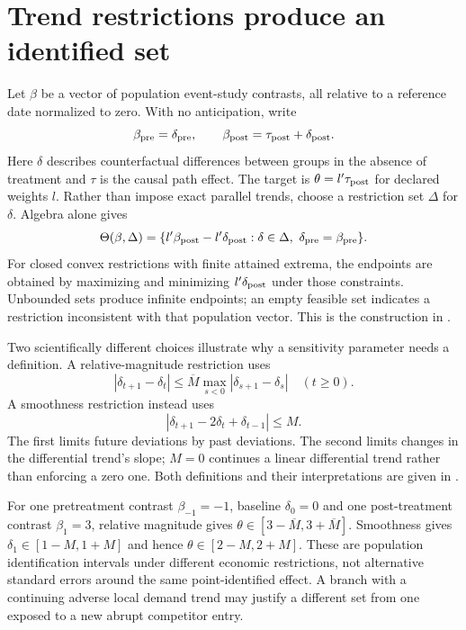\section{Trend restrictions produce an identified set}
\label{r3:trend-sensitivity}
Let $\beta$ be a vector of population event-study contrasts, all
relative to a reference date normalized to zero. With no anticipation,
write
\[
 \beta_{\rm pre}=\delta_{\rm pre},\qquad
 \beta_{\rm post}=\tau_{\rm post}+\delta_{\rm post}.
\]
Here $\delta$ describes counterfactual differences between groups in
the absence of treatment and $\tau$ is the causal path effect. The
target is $\theta=l'\tau_{\rm post}$ for declared weights $l$.
Rather than impose exact parallel trends, choose a restriction set
$\Delta$ for $\delta$. Algebra alone gives
\begin{equation}
 \Theta(\beta,\Delta)=
 \{l'\beta_{\rm post}-l'\delta_{\rm post}:
                \delta\in\Delta,\ \delta_{\rm pre}=\beta_{\rm pre}\}.
 \label{r3:trend-set}
\end{equation}
For closed convex restrictions with finite attained extrema,
the endpoints are obtained by maximizing and minimizing
$l'\delta_{\rm post}$ under those constraints. Unbounded sets
produce infinite endpoints; an empty feasible set indicates a
restriction inconsistent with that population vector. This is the
construction in \citet[Section 2.3 and Lemma 2.1]{rambachan2023}.

Two scientifically different choices illustrate why a sensitivity
parameter needs a definition. A relative-magnitude restriction uses
\[
 |\delta_{t+1}-\delta_t|
 \le\overline M\max_{s<0}|\delta_{s+1}-\delta_s|\quad(t\ge0).
\]
A smoothness restriction instead uses
\[
 |\delta_{t+1}-2\delta_t+\delta_{t-1}|\le M.
\]
The first limits future deviations by past deviations. The second
limits changes in the differential trend's slope; $M=0$ continues
a linear differential trend rather than enforcing a zero one.
Both definitions and their interpretations are given in
\citet[Sections 2.4.1--2.4.4]{rambachan2023}.

For one pretreatment contrast $\beta_{-1}=-1$, baseline
$\delta_0=0$ and one post-treatment contrast $\beta_1=3$,
relative magnitude gives $\theta\in[3-\overline M,3+\overline M]$.
Smoothness gives $\delta_1\in[1-M,1+M]$ and hence
$\theta\in[2-M,2+M]$. These are population identification intervals
under different economic restrictions, not alternative standard
errors around the same point-identified effect. A branch with a
continuing adverse local demand trend may justify a different set
from one exposed to a new abrupt competitor entry.

